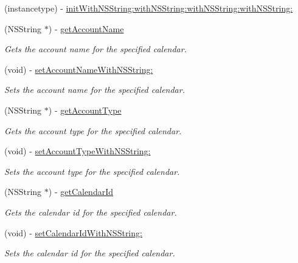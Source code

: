 \begin{DoxyCompactItemize}
\item 
(instancetype) -\/ \hyperlink{interface_calendar_details_adb34b1dcb1ee584ce5d134ced2c347f8}{init\+With\+N\+S\+String\+:with\+N\+S\+String\+:with\+N\+S\+String\+:with\+N\+S\+String\+:}
\item 
(N\+S\+String $\ast$) -\/ \hyperlink{interface_calendar_details_a0c31dc0e2ce18a2a6e1c51b163d138d2}{get\+Account\+Name}
\begin{DoxyCompactList}\small\item\em Gets the account name for the specified calendar. \end{DoxyCompactList}\item 
(void) -\/ \hyperlink{interface_calendar_details_acf884252df8ffb75a0b591aecd5bc1f0}{set\+Account\+Name\+With\+N\+S\+String\+:}
\begin{DoxyCompactList}\small\item\em Sets the account name for the specified calendar. \end{DoxyCompactList}\item 
(N\+S\+String $\ast$) -\/ \hyperlink{interface_calendar_details_aafb5a18ce4c99431d5eb15e0de369e89}{get\+Account\+Type}
\begin{DoxyCompactList}\small\item\em Gets the account type for the specified calendar. \end{DoxyCompactList}\item 
(void) -\/ \hyperlink{interface_calendar_details_a4588b92d47565ac12d1b7ca548fd468f}{set\+Account\+Type\+With\+N\+S\+String\+:}
\begin{DoxyCompactList}\small\item\em Sets the account type for the specified calendar. \end{DoxyCompactList}\item 
(N\+S\+String $\ast$) -\/ \hyperlink{interface_calendar_details_a0b205a0015823cf2716d4451bc371692}{get\+Calendar\+Id}
\begin{DoxyCompactList}\small\item\em Gets the calendar id for the specified calendar. \end{DoxyCompactList}\item 
(void) -\/ \hyperlink{interface_calendar_details_adabd50acc629570b1b18e32f26b88e29}{set\+Calendar\+Id\+With\+N\+S\+String\+:}
\begin{DoxyCompactList}\small\item\em Sets the calendar id for the specified calendar. \end{DoxyCompactList}\item 

\end{DoxyCompactItemize}
